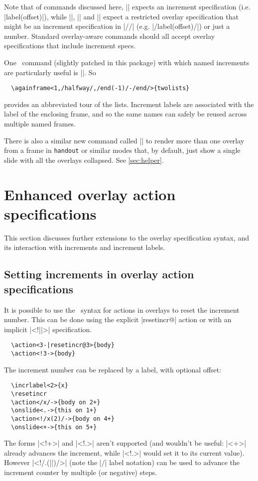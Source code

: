 \documentclass[a4paper]{ltxdoc}
\begin{document}
Note that of commands discussed here, |\incrref| expects an increment
specification (i.e. |label(offset)|), while |\resetincr|, |\fromincr| and
|\incrlabel| expect a restricted overlay specification that might be an
increment specification in |//| (e.g. |/label(offset)/|) or just a number.
Standard overlay-aware commands should all accept overlay specifications that
include increment specs.

One \beamer\ command (slightly patched in this package) with which named
increments are particularly useful is |\againframe|.  So \example
\begin{verbatim}
  \againframe<1,/halfway/,/end(-1)/-/end/>{twolists}
\end{verbatim}
provides an abbreviated tour of the lists.  Increment labels are associated with
the label of the enclosing frame, and so the same names can safely be reused
across multiple named frames.

There is also a similar new command called |\handoutframe| to render more than
one overlay from a frame in \texttt{handout} or similar modes that, by default,
just show a single slide with all the overlays collapsed.  See \cref{sec:helper}.

\section{Enhanced overlay action specifications}\label{sec:actions}

This section discusses further extensions to the overlay specification syntax,
and its interaction with increments and increment labels.


\subsection{Setting increments in overlay action specifications} \label{sec:actions:!}

It is possible to use the \beamer\ syntax for actions in overlays to reset the
increment number.  This can be done using the explicit |resetincr@| action or
with an implicit |<!||>| specification.  \example
\begin{verbatim}
  \action<3-|resetincr@3>{body}
  \action<!3->{body}
\end{verbatim}
The increment number can be replaced by a label, with optional offset:
\begin{verbatim}
  \incrlabel<2>{x}
  \resetincr
  \action</x/->{body on 2+}
  \onslide<.->{this on 1+}
  \action<!/x(2)/->{body on 4+}
  \onslide<+->{this on 5+}
\end{verbatim}
The forms |<!+>| and |<!.>| aren't supported (and wouldn't be useful: |<+>|
already advances the increment, while |<!.>| would set it to its current value).
However |<!/.(||)/>| (note the |/| label notation) can be used to advance the
increment counter by multiple (or negative) steps.
\end{document}
